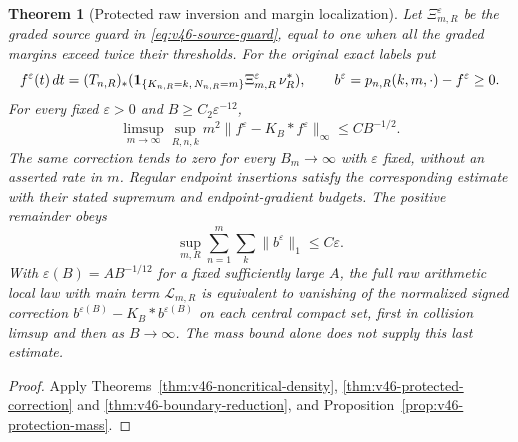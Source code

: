 \documentclass[11pt,reqno]{amsart}
\numberwithin{equation}{section}
\newtheorem{leadtheorem}{Theorem}
\theoremstyle{definition}\newtheorem{definition}[theorem]{Definition}
\theoremstyle{remark}\newtheorem{remark}[theorem]{Remark}
\begin{document}
\begin{leadtheorem}[Protected raw inversion and margin localization]
\label{thm:intro-v46-protected-inverse}
Let $\Xi_{m,R}^{\varepsilon}$ be the graded source guard in
\eqref{eq:v46-source-guard}, equal to one when all the graded margins
exceed twice their thresholds. For the original exact labels put
\[
 f^\varepsilon(t)\,dt
  =(T_{n,R})_*(\mathbf1_{\{K_{n,R}=k,\,N_{n,R}=m\}}
                   \Xi_{m,R}^{\varepsilon}\,\nu_R^*),\qquad
 b^\varepsilon=p_{n,R}(k,m,\cdot)-f^\varepsilon\ge0.
\]
For every fixed $\varepsilon>0$ and $B\ge C_2\varepsilon^{-12}$,
\begin{equation}\label{eq:intro-v46-band-modulus}
 \limsup_{m\to\infty}\sup_{R,n,k}
     m^2\|f^\varepsilon-K_B*f^\varepsilon\|_\infty
                                 \le C B^{-1/2}.
\end{equation}
The same correction tends to zero for every $B_m\to\infty$ with
$\varepsilon$ fixed, without an asserted rate in $m$. Regular endpoint
insertions satisfy the corresponding estimate with their stated
supremum and endpoint-gradient budgets. The positive remainder obeys
\[
 \sup_{m,R}\sum_{n=1}^m\sum_k\|b^\varepsilon\|_1
                                    \le C\varepsilon.
\]
With $\varepsilon(B)=AB^{-1/12}$ for a fixed sufficiently large $A$,
the full raw arithmetic local law with main term $\mathcal L_{m,R}$
is equivalent to vanishing of the normalized signed correction
$b^{\varepsilon(B)}-K_B*b^{\varepsilon(B)}$ on each central compact
set, first in collision limsup and then as $B\to\infty$.
The mass bound alone does not supply this last estimate.
\end{leadtheorem}
\begin{proof}
Apply Theorems~\ref{thm:v46-noncritical-density},
\ref{thm:v46-protected-correction} and
\ref{thm:v46-boundary-reduction}, and
Proposition~\ref{prop:v46-protection-mass}.
\end{proof}
\end{document}
